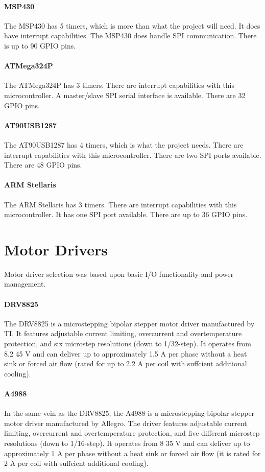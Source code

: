 \paragraph{MSP430} The MSP430 has 5 timers, which is more than what the project will need.
It does have interrupt capabilities.
The MSP430 does handle SPI communication. 
There is up to 90 GPIO pins.

\paragraph{ATMega324P} The ATMega324P has 3 timers.
There are interrupt capabilities with this microcontroller.
A master/slave SPI serial interface is available.
There are 32 GPIO pins.   

\paragraph{AT90USB1287} The AT90USB1287 has 4 timers, which is what the project needs.
There are interrupt capabilities with this microcontroller.
There are two SPI ports available. 
There are 48 GPIO pins.

\paragraph{ARM Stellaris} The ARM Stellaris has 3 timers.
There are interrupt capabilities with this microcontroller.
It has one SPI port available.
There are up to 36 GPIO pins.

\section{Motor Drivers}
Motor driver selection was based upon basic I/O functionality and power management.

\paragraph{DRV8825}
The DRV8825 is a microstepping bipolar stepper motor driver manufactured by TI.
It features adjustable current limiting, overcurrent and overtemperature protection, and six microstep resolutions (down to 1/32-step).
It operates from 8.2 45 V and can deliver up to approximately 1.5 A per phase without a heat sink or forced air ﬂow (rated for up to 2.2 A per coil with suffcient additional cooling).

\paragraph{A4988}
In the same vein as the DRV8825, the A4988 is a microstepping bipolar stepper motor driver manufactured by Allegro.
The driver features adjustable current limiting, overcurrent and overtemperature protection, and ﬁve different microstep resolutions (down to 1/16-step).
It operates from 8 35 V and can deliver up to approximately 1 A per phase without a heat sink or forced air ﬂow (it is rated for 2 A per coil with suffcient additional cooling).

